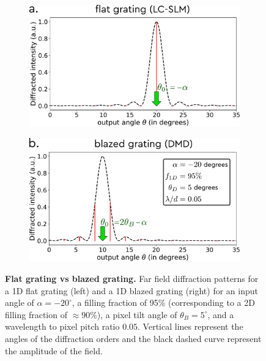 \documentclass[12pt]{iopart}
\begin{document}
\begin{figure}
  \centering
  \begin{subfigure}{0.49\textwidth}
    \centering
    \includegraphics[width = \textwidth]{images/gratings_flat.pdf}
    \label{fig:flat_grating}
  \end{subfigure}
  \begin{subfigure}{0.49\textwidth}
    \centering
    \includegraphics[width = \textwidth]{images/gratings_blazed.pdf}
    \label{fig:blazed_right}
  \end{subfigure}
  \caption{
    \textbf{Flat grating vs blazed grating.}
    Far field diffraction patterns for a 1D flat grating (left) and a 1D blazed grating (right)
    for an input angle of $\alpha = -20^\circ$,
    a filling fraction of 95\% (corresponding to a 2D filling fraction of $\approx 90$\%),
    a pixel tilt angle of $\theta_B = 5^\circ$,
    and a wavelength to pixel pitch ratio $0.05$.
    Vertical lines represent the angles of the diffraction orders
    and the black dashed curve represent the amplitude of the field.
  }
  \label{fig:gratings}
\end{figure}
\end{document}
